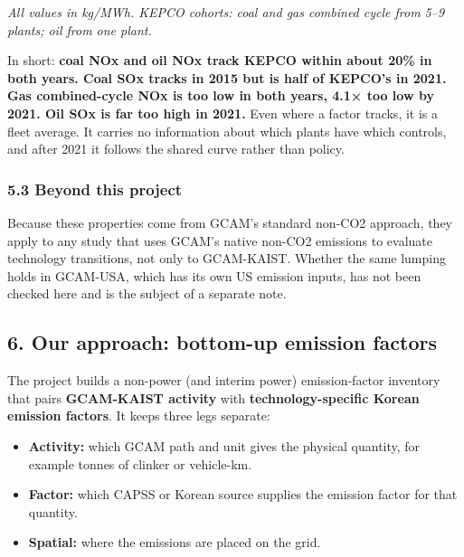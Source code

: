 \emph{All values in kg/MWh. KEPCO cohorts: coal and gas combined cycle from
5--9 plants; oil from one plant.}

In short: \textbf{coal NOx and oil NOx track KEPCO within about 20\% in both
years. Coal SOx tracks in 2015 but is half of KEPCO's in 2021. Gas
combined-cycle NOx is too low in both years, 4.1× too low by 2021. Oil SOx is
far too high in 2021.} Even where a factor tracks, it is a fleet average. It
carries no information about which plants have which controls, and after
2021 it follows the shared curve rather than policy.

\hypertarget{beyond-this-project}{%
\subsubsection*{5.3 Beyond this project}\label{beyond-this-project}}

Because
these
properties
come from
GCAM's
standard
non-CO2
approach,
they apply
to any
study that
uses
GCAM's
native
non-CO2
emissions
to
evaluate
technology
transitions,
not only
to
GCAM-KAIST.
Whether
the same
lumping
holds in
GCAM-USA,
which has
its own US
emission
inputs,
has not
been
checked
here and
is the
subject of
a separate
note.

\hypertarget{our-approach-bottom-up-emission-factors}{%
\subsection*{6. Our approach: bottom-up emission factors \plainmark{}}\label{our-approach-bottom-up-emission-factors}}

The
project
builds a
non-power
(and
interim
power)
emission-factor
inventory
that pairs
\textbf{GCAM-KAIST
activity}
with
\textbf{technology-specific
Korean
emission
factors}.
It keeps
three legs
separate:

\begin{itemize}
\tightlist
\item
  \textbf{Activity:}
  which
  GCAM
  path and
  unit
  gives
  the
  physical
  quantity,
  for
  example
  tonnes
  of
  clinker
  or
  vehicle-km.
\item
  \textbf{Factor:}
  which
  CAPSS or
  Korean
  source
  supplies
  the
  emission
  factor
  for that
  quantity.
\item
  \textbf{Spatial:}
  where
  the
  emissions
  are
  placed
  on the
  grid.
\end{itemize}

